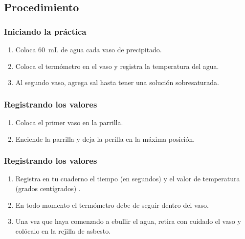 \documentclass[14pt]{beamer}
\begin{document}
\subsection{Procedimiento}

\begin{frame}
\frametitle{Iniciando la práctica}
\begin{enumerate}[<+->]
\item Coloca \SI{60}{\milli\liter} de agua cada vaso de precipitado.
\item Coloca el termómetro en el vaso y registra la temperatura del agua.
\item Al segundo vaso, agrega sal hasta tener una solución sobresaturada.
\seti
\end{enumerate}
\end{frame}
\begin{frame}
\frametitle{Registrando los valores}
\begin{enumerate}[<+->]
\conti
\item Coloca el primer vaso en la parrilla.
\item Enciende la parrilla y deja la perilla en la máxima posición.
\seti
\end{enumerate}
\end{frame}
\begin{frame}
\frametitle{Registrando los valores}
\begin{enumerate}[<+->]
\conti
\item Registra en tu cuaderno el tiempo (en segundos) y el valor de temperatura (grados centígrados) .
\item En todo momento el termómetro debe de seguir dentro del vaso.
\item Una vez que haya comenzado a ebullir el agua, retira con cuidado el vaso y colócalo en la rejilla de asbesto.
\seti
\end{enumerate}
\end{frame}
\end{document}
